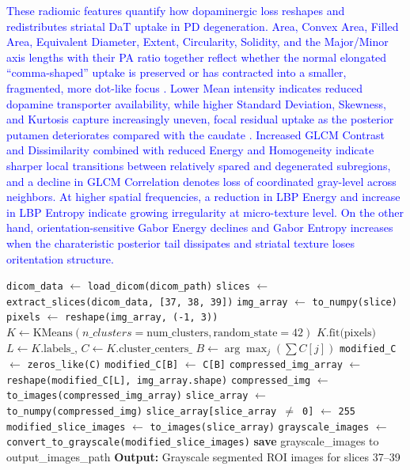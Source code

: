 \documentclass[twocolumn]{article}
\begin{document}
\textcolor{blue}{These radiomic features quantify how dopaminergic loss reshapes and redistributes striatal DaT uptake in PD degeneration. Area, Convex Area, Filled Area, Equivalent Diameter, Extent, Circularity, Solidity, and the Major/Minor axis lengths with their PA ratio together reflect whether the normal elongated “comma-shaped” uptake is preserved or has contracted into a smaller, fragmented, more dot-like focus \cite{morbelli2020eanm, mercer2024practical}. Lower Mean intensity indicates reduced dopamine transporter availability, while higher Standard Deviation, Skewness, and Kurtosis capture increasingly uneven, focal residual uptake as the posterior putamen deteriorates compared with the caudate \cite{mayerhoefer2020introduction}. Increased GLCM Contrast and Dissimilarity combined with reduced Energy and Homogeneity indicate sharper local transitions between relatively spared and degenerated subregions, and a decline in GLCM Correlation denotes loss of coordinated gray-level across neighbors. At higher spatial frequencies, a reduction in LBP Energy and increase in LBP Entropy indicate growing irregularity at micro-texture level. On the other hand, orientation-sensitive Gabor Energy declines and Gabor Entropy increases when the charateristic posterior tail dissipates and striatal texture loses oritentation structure.}

\begin{algorithm} [ht!]
\caption{K-Means Clustering for Radiomics Processing}
\label{algo1}
\begin{algorithmic}[1]
    \State \texttt{dicom\_data} $\gets$ \texttt{load\_dicom(dicom\_path)}
    \State \texttt{slices} $\gets$ \texttt{extract\_slices(dicom\_data, [37, 38, 39])}
        \State \texttt{img\_array} $\gets$ \texttt{to\_numpy(slice)}
        \State \texttt{pixels} $\gets$ \texttt{reshape(img\_array, (-1, 3))}
        \State $K \gets \text{KMeans}(n\_clusters = \text{num\_clusters}, \text{random\_state}=42)$
        \State $K.\text{fit(pixels)}$
        \State $L \gets K.\text{labels\_}$, \quad $C \gets K.\text{cluster\_centers\_}$
        \State $B \gets \arg\max_j(\sum C[j])$
        \State \texttt{modified\_C} $\gets$ \texttt{zeros\_like(C)}
        \State \texttt{modified\_C[B]} $\gets$ \texttt{C[B]}
        \State \texttt{compressed\_img\_array} $\gets$ \texttt{reshape(modified\_C[L], img\_array.shape)}
        \State \texttt{compressed\_img} $\gets$ \texttt{to\_images(compressed\_img\_array)}
        \State \texttt{slice\_array} $\gets$ \texttt{to\_numpy(compressed\_img)}
        \State \texttt{slice\_array[slice\_array $\neq$ 0]} $\gets$ \texttt{255}
        \State \texttt{modified\_slice\_images} $\gets$ \texttt{to\_images(slice\_array)}
        \State \texttt{grayscale\_images} $\gets$ \texttt{convert\_to\_grayscale(modified\_slice\_images)}
        \State \textbf{save} grayscale\_images to output\_images\_path
    \EndFor
    \State \textbf{Output:} Grayscale segmented ROI images for slices 37--39
\EndProcedure
\end{algorithmic}
\end{algorithm}
\end{document}
